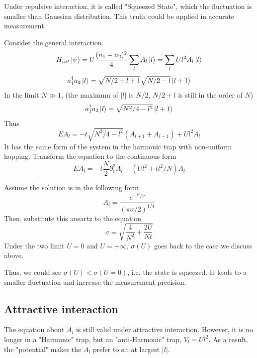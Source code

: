 Under repulsive interaction, it is called "Squeezed State", which the fluctuation is smaller than Gaussian distribution. This truth could be applied in accurate measurement.

Consider the general interaction. 
\begin{equation}
H_{int} \ket\psi  = U\frac{(n_1-n_2)^2}{4} \sum_l A_l \ket{l} = \sum_l U l^2 A_l \ket{l}
\end{equation}
\begin{equation}
a_1^\dag a_2 \ket l  = \sqrt{N/2+l+1}\sqrt{N/2-l} \ket{l+1} 
\end{equation}
In the limit $N \gg 1$, (the maximum of $|l|$ is $N/2$, $N/2+l$ is still in the order of $N$)
\begin{equation}
a_1^\dag a_2 \ket l = \sqrt{N^2/4-l^2}\ket{l+1}
\end{equation}
Thus
\begin{equation}
E A_l = -t \sqrt{N^2/4-l^2}(A_{l+1}+A_{l-1}) + Ul^2 A_l
\end{equation}
It has the same form of the system in the harmonic trap with non-uniform hopping. 
Transform the equation to the continuous form
\begin{equation}
E A_l = -t \frac{N}{2} \partial_l^2 A_l + (U l^2+ tl^2/N) A_l
\end{equation}

Assume the solution is in the following form
\begin{equation}
A_l = \frac{e^{-l^2/\sigma}}{(\pi \sigma /2)^{1/4}}
\end{equation}
Then, substitute this ansartz to the equation
\begin{equation}
\sigma = \sqrt{\frac{4}{N^2}+\frac{2U}{Nt}}
\end{equation}
Under the two limit $U = 0$ and $U = +\infty$, $\sigma(U)$ goes back to the case we discuss above.

Thus, we could see $\sigma(U) < \sigma(U = 0)$, i.e. the state is squeezed. It leads to a smaller fluctuation and increase the measurement precision.

\subsection{Attractive interaction}
The equation about $A_l$ is still valid under attractive interaction. However, it is no longer in a "Harmonic" trap, but an "anti-Harmonic" trap, $V_l =Ul^2$.
As a result, the "potential" makes the $A_l$ prefer to sit at largest $|l|$.

